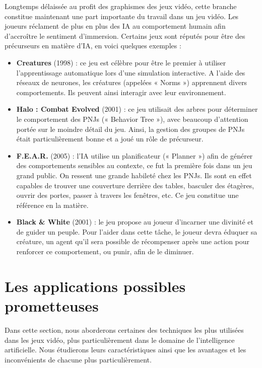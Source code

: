 \documentclass[a4paper, 12pt]{article} %
\begin{document}
Longtemps délaissée au profit des graphismes des jeux vidéo, cette branche constitue maintenant une part importante du travail dans un jeu vidéo. Les joueurs réclament de plus en plus des IA au comportement humain afin d'accroître le sentiment d’immersion. Certains jeux sont réputés pour être des précurseurs en matière d’IA, en voici quelques exemples : 

\begin{itemize}
	\item \textbf{Creatures} (1998) : ce jeu est célèbre pour être le premier à utiliser l’apprentissage automatique lors d’une simulation interactive. A l’aide des réseaux de neurones, les créatures (appelées « Norms ») apprennent divers comportements. Ils peuvent ainsi interagir avec leur environnement. 

	\item \textbf{Halo : Combat Evolved} (2001) : ce jeu utilisait des arbres pour déterminer le comportement des PNJs (« Behavior Tree »), avec beaucoup d’attention portée sur le moindre détail du jeu. Ainsi, la gestion des groupes de PNJs était particulièrement bonne et a joué un rôle de précurseur. 

	\item \textbf{F.E.A.R.} (2005) : l’IA utilise un planificateur (« Planner ») afin de générer des comportements sensibles au contexte, ce fut la première fois dans un jeu grand public. On ressent une grande habileté chez les PNJs. Ils sont en effet capables de trouver une couverture derrière des tables, basculer des étagères, ouvrir des portes, passer à travers les fenêtres, etc. Ce jeu constitue une référence en la matière.  

	\item \textbf{Black \& White} (2001) : le jeu propose au joueur d’incarner une divinité et de guider un peuple. Pour l’aider dans cette tâche, le joueur devra éduquer sa créature, un agent qu’il sera possible de récompenser après une action pour renforcer ce comportement, ou punir, afin de le diminuer. 
\end{itemize}

\newpage
\section{Les applications possibles prometteuses}

Dans cette section, nous aborderons certaines des techniques les plus utilisées dans les jeux vidéo, plus particulièrement dans le domaine de l’intelligence artificielle. Nous étudierons leurs caractéristiques ainsi que les avantages et les inconvénients de chacune plus particulièrement.
\end{document}

